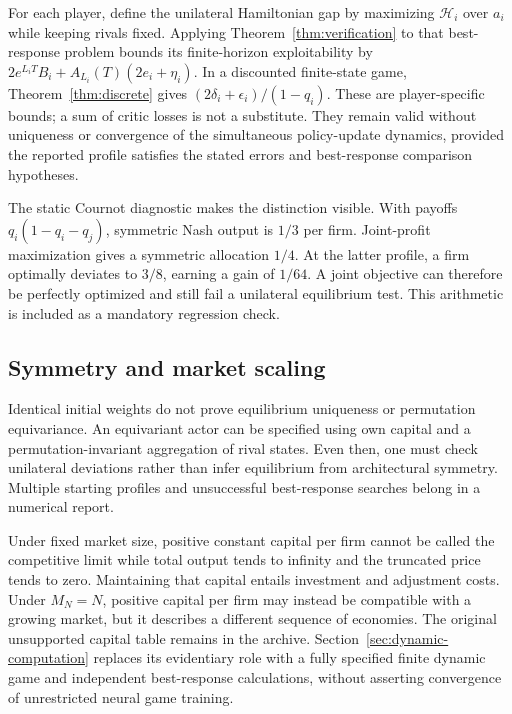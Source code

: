 \documentclass[ecta,draft]{econsocart}
\theoremstyle{definition}
\theoremstyle{remark}
\newcommand{\HH}{\mathcal H}
\begin{document}
For each player, define the unilateral Hamiltonian gap by maximizing $\HH_i$ over $a_i$ while keeping rivals fixed. Applying Theorem~\ref{thm:verification} to that best-response problem bounds its finite-horizon exploitability by $2e^{L_iT}B_i+A_{L_i}(T)(2e_i+\eta_i)$. In a discounted finite-state game, Theorem~\ref{thm:discrete} gives $(2\delta_i+\epsilon_i)/(1-q_i)$. These are player-specific bounds; a sum of critic losses is not a substitute. They remain valid without uniqueness or convergence of the simultaneous policy-update dynamics, provided the reported profile satisfies the stated errors and best-response comparison hypotheses.

The static Cournot diagnostic makes the distinction visible. With payoffs $q_i(1-q_i-q_j)$, symmetric Nash output is $1/3$ per firm. Joint-profit maximization gives a symmetric allocation $1/4$. At the latter profile, a firm optimally deviates to $3/8$, earning a gain of $1/64$. A joint objective can therefore be perfectly optimized and still fail a unilateral equilibrium test. This arithmetic is included as a mandatory regression check.

\subsection{Symmetry and market scaling}
Identical initial weights do not prove equilibrium uniqueness or permutation equivariance. An equivariant actor can be specified using own capital and a permutation-invariant aggregation of rival states. Even then, one must check unilateral deviations rather than infer equilibrium from architectural symmetry. Multiple starting profiles and unsuccessful best-response searches belong in a numerical report.

Under fixed market size, positive constant capital per firm cannot be called the competitive limit while total output tends to infinity and the truncated price tends to zero. Maintaining that capital entails investment and adjustment costs. Under $M_N=N$, positive capital per firm may instead be compatible with a growing market, but it describes a different sequence of economies. The original unsupported capital table remains in the archive. Section~\ref{sec:dynamic-computation} replaces its evidentiary role with a fully specified finite dynamic game and independent best-response calculations, without asserting convergence of unrestricted neural game training.


\end{document}
